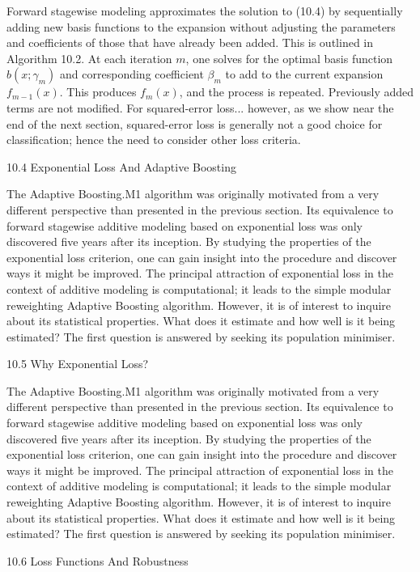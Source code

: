 Forward stagewise modeling approximates the solution to (10.4) by sequentially adding new basis functions to the expansion without adjusting the parameters and coefficients of those that have already been added. This is outlined in Algorithm 10.2. At each iteration $m$, one solves for the optimal basis function $b(x;\gamma_m)$ and corresponding coefficient $\beta_m$ to add to the current expansion $f_{m-1}(x)$. This produces $f_m(x)$, and the process is repeated. Previously added terms are not modified. For squared-error loss... however, as we show near the end of the next section, squared-error loss is generally not a good choice for classification; hence the need to consider other loss criteria.

10.4 Exponential Loss And Adaptive Boosting

The Adaptive Boosting.M1 algorithm was originally motivated from a very different perspective than presented in the previous section. Its equivalence to forward stagewise additive modeling based on exponential loss was only discovered five years after its inception. By studying the properties of the exponential loss criterion, one can gain insight into the procedure and discover ways it might be improved. The principal attraction of exponential loss in the context of additive modeling is computational; it leads to the simple modular reweighting Adaptive Boosting algorithm. However, it is of interest to inquire about its statistical properties. What does it estimate and how well is it being estimated? The first question is answered by seeking its population minimiser.

10.5 Why Exponential Loss?

The Adaptive Boosting.M1 algorithm was originally motivated from a very different perspective than presented in the previous section. Its equivalence to forward stagewise additive modeling based on exponential loss was only discovered five years after its inception. By studying the properties of the exponential loss criterion, one can gain insight into the procedure and discover ways it might be improved. The principal attraction of exponential loss in the context of additive modeling is computational; it leads to the simple modular reweighting Adaptive Boosting algorithm. However, it is of interest to inquire about its statistical properties. What does it estimate and how well is it being estimated? The first question is answered by seeking its population minimiser.

10.6 Loss Functions And Robustness

